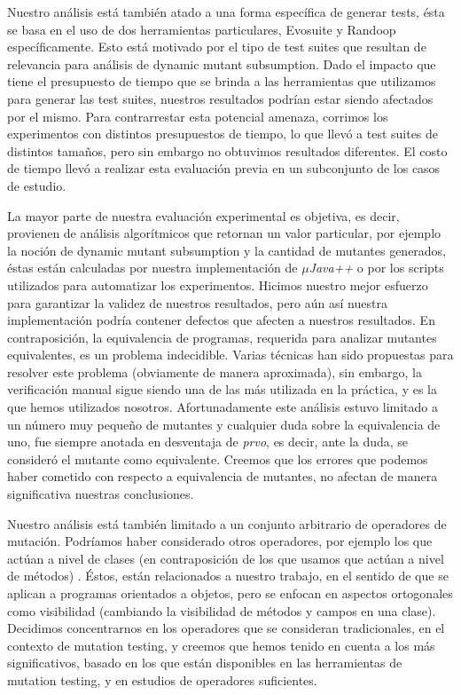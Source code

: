 Nuestro an\'alisis est\'a tambi\'en atado a una forma espec\'ifica de generar tests, \'esta se basa en el uso de dos herramientas particulares, Evosuite y Randoop espec\'ificamente. Esto est\'a motivado por el tipo de test suites que resultan de relevancia para an\'alisis de dynamic mutant subsumption. Dado el impacto que tiene el presupuesto de tiempo que se brinda a las herramientas que utilizamos para generar las test suites, nuestros resultados podr\'ian estar siendo afectados por el mismo. Para contrarrestar esta potencial amenaza, corrimos los experimentos con distintos presupuestos de tiempo, lo que llev\'o a test suites de distintos tama\~nos, pero sin embargo no obtuvimos resultados diferentes. El costo de tiempo llev\'o a realizar esta evaluaci\'on previa en un subconjunto de los casos de estudio.

La mayor parte de nuestra evaluaci\'on experimental es objetiva, es decir, provienen de an\'alisis algor\'itmicos  que retornan un valor particular, por ejemplo la noci\'on de dynamic mutant subsumption y la cantidad de mutantes generados, \'estas est\'an calculadas por nuestra implementaci\'on de \emph{$\mu$Java++} o por los scripts utilizados para automatizar los experimentos. Hicimos nuestro mejor esfuerzo para garantizar la validez de nuestros resultados, pero a\'un as\'i nuestra implementaci\'on podr\'ia contener defectos que afecten a nuestros resultados. En contraposici\'on, la equivalencia de programas, requerida para analizar mutantes equivalentes, es un problema indecidible. Varias t\'ecnicas han sido propuestas para resolver este problema (obviamente de manera aproximada), sin embargo, la verificaci\'on manual sigue siendo una de las m\'as utilizada en la pr\'actica, y es la que hemos utilizados nosotros. Afortunadamente este an\'alisis estuvo limitado a un n\'umero muy peque\~no de mutantes y cualquier duda sobre la equivalencia de uno, fue siempre anotada en desventaja de \emph{prvo}, es decir, ante la duda, se consider\'o el mutante como equivalente. Creemos que los errores que podemos haber cometido con respecto a equivalencia de mutantes, no afectan de manera significativa nuestras conclusiones.

Nuestro an\'alisis est\'a tambi\'en limitado a un conjunto arbitrario de operadores de mutaci\'on. Podr\'iamos haber considerado otros operadores, por ejemplo los que act\'uan a nivel de clases (en contraposici\'on de los que usamos que act\'uan a nivel de m\'etodos) \cite{bibliography.mutation.class-level-ops}. \'Estos, est\'an relacionados a nuestro trabajo, en el sentido de que se aplican a programas orientados a objetos, pero se enfocan en aspectos ortogonales como visibilidad (cambiando la visibilidad de m\'etodos y campos en una clase). Decidimos concentrarnos en los operadores que se consideran tradicionales, en el contexto de mutation testing, y creemos que hemos tenido en cuenta a los m\'as significativos, basado en los que est\'an disponibles en las herramientas de mutation testing, y en estudios de operadores suficientes.

